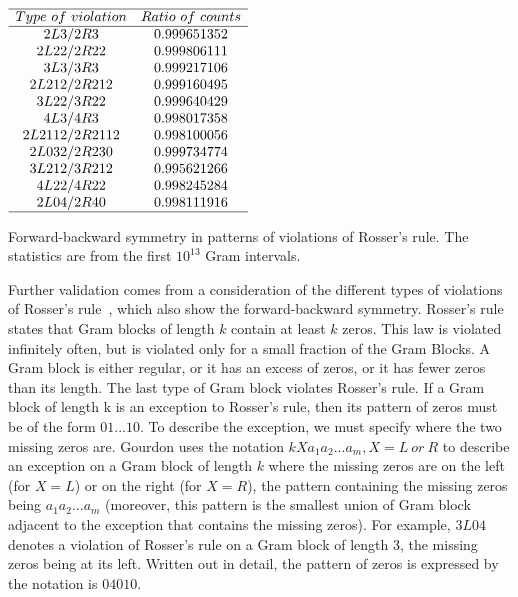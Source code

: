 \documentclass[twoside]{article}
\begin{document}
  
\begin{table}
\centering \(\begin{array}{cc}
\hline
Type~of~violation &Ratio~of~counts\\
\hline
2L3/2R3 &0.999651352\\
2L22/2R22 &0.999806111\\
3L3/3R3 &0.999217106\\
2L212/2R212 &0.999160495\\
3L22/3R22 &0.999640429\\
4L3/4R3 &0.998017358\\
2L2112/2R2112 &0.998100056\\
2L032/2R230 &0.999734774\\
3L212/3R212 &0.995621266\\
4L22/4R22 &0.998245284\\
2L04/2R40 &0.998111916\\
\hline
\end{array}\)
\caption{Forward-backward symmetry in patterns of violations of Rosser's rule.  The statistics are from the first $10^{13}$ Gram intervals.} \label{tab:vrr}
\end{table}

Further validation comes from a consideration of the different types of violations of Rosser's rule~\cite{gourdon}, which also show the forward-backward symmetry. Rosser's rule states that Gram blocks of length $k$ contain at least $k$ zeros. This law is violated infinitely often, but is violated only for a small fraction of the Gram Blocks. A Gram block is either regular, or it has an excess of zeros, or it has fewer zeros than its length. The last type of Gram block violates Rosser's rule. 
If a Gram block of length k is an exception to Rosser's rule, then its pattern of zeros must be of the form $01...10$. To describe the exception, we must specify where the two missing zeros are. Gourdon uses the notation $kXa_1a_2 . . . a_m, X = L~or~R $ 
to describe an exception on a Gram block of length $k$  where the missing zeros are on the left (for $X = L$) or on the right (for $X = R$), the pattern containing the missing zeros being $a_1a_2 . . . a_m$ (moreover, this pattern is the smallest union of Gram block adjacent to the exception that contains the missing zeros). For example, $3L04$ denotes a violation of Rosser's rule on a Gram block of length 3, the missing zeros being at its left. Written out in detail, the pattern of zeros is expressed by the notation is $04010$.
\end{document}
